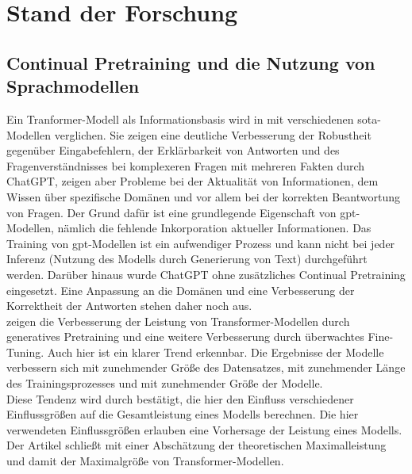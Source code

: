 \chapter{Stand der Forschung}\label{ch:relatedWork}
\section{Continual Pretraining und die Nutzung von Sprachmodellen}

Ein Tranformer-Modell als Informationsbasis wird in \citet{chatgpt_qas} mit verschiedenen \ac{sota}-Modellen verglichen. 
Sie zeigen eine deutliche Verbesserung der Robustheit gegenüber Eingabefehlern, der Erklärbarkeit von Antworten und des Fragenverständnisses bei komplexeren Fragen mit mehreren Fakten durch ChatGPT, zeigen aber Probleme bei der Aktualität von Informationen, dem Wissen über spezifische Domänen und vor allem bei der korrekten Beantwortung von Fragen. 
Der Grund dafür ist eine grundlegende Eigenschaft von \ac{gpt}-Modellen, nämlich die fehlende Inkorporation aktueller Informationen. 
Das Training von \ac{gpt}-Modellen ist ein aufwendiger Prozess und kann nicht bei jeder Inferenz (Nutzung des Modells durch Generierung von Text) durchgeführt werden. 
Darüber hinaus wurde ChatGPT ohne zusätzliches Continual Pretraining eingesetzt.
Eine Anpassung an die Domänen und eine Verbesserung der Korrektheit der Antworten stehen daher noch aus.\\

\citet{improve_language} zeigen die Verbesserung der Leistung von Transformer-Modellen durch generatives Pretraining und eine weitere Verbesserung durch überwachtes Fine-Tuning.
Auch hier ist ein klarer Trend erkennbar. Die Ergebnisse der Modelle verbessern sich mit zunehmender Größe des Datensatzes, mit zunehmender Länge des Trainingsprozesses und mit zunehmender Größe der Modelle.\\

Diese Tendenz wird durch \citet{scaling_laws} bestätigt, die hier den Einfluss verschiedener Einflussgrößen auf die Gesamtleistung eines Modells berechnen. Die hier verwendeten Einflussgrößen erlauben eine Vorhersage der Leistung eines Modells. 
Der Artikel schließt mit einer Abschätzung der theoretischen Maximalleistung und damit der Maximalgröße von Transformer-Modellen.\\

